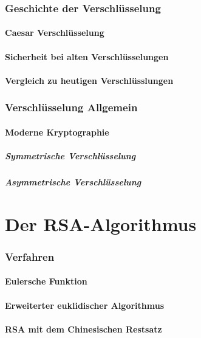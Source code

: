 \documentclass[12pt,a4paper,german]{article}
\begin{document}
\section{Geschichte der Verschlüsselung}
\subsection{Caesar Verschlüsselung}
\subsection{Sicherheit bei alten Verschlüsselungen}
\subsection{Vergleich zu heutigen Verschlüsslungen}

\section{Verschlüsselung Allgemein}
\subsection{Moderne Kryptographie}
\subsubsection{Symmetrische Verschlüsselung}
\subsubsection{Asymmetrische Verschlüsselung}

\newpage
\part{Der RSA-Algorithmus}
\section{Verfahren}
\subsection{Eulersche Funktion}
\subsection{Erweiterter euklidischer Algorithmus}
\subsection{RSA mit dem Chinesischen Restsatz}
\end{document}
